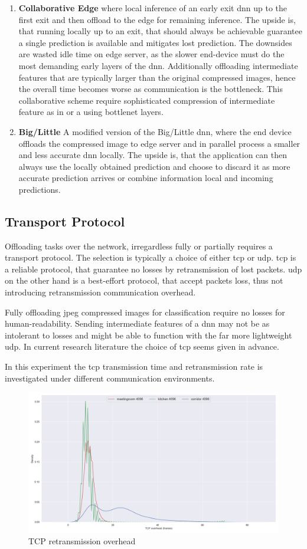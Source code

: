 \begin{enumerate}
	\item \textbf{Collaborative Edge} where local inference of an early exit \gls{dnn} up to the first exit and then offload to the edge for remaining inference. The upside is, that running locally up to an exit, that should always be achievable guarantee a single prediction is available and mitigates lost prediction. The downsides are wasted idle time on edge server, as the slower end-device must do the most demanding early layers of the \gls{dnn}. Additionally offloading intermediate features that are typically larger than the original compressed images, hence the overall time becomes worse as communication is the bottleneck. This collaborative scheme require sophisticated compression of intermediate feature as in \cite{choi_near-lossless_2018} or a using \gls{bottlenet} layers.
	\item \textbf{Big/Little} A modified version of the Big/Little \gls{dnn}, where the end device offloads the compressed image to edge server and in parallel process a smaller and less accurate \gls{dnn} locally. The upside is, that the application can then always use the locally obtained prediction and choose to discard it as more accurate prediction arrives or combine information local and incoming predictions.
\end{enumerate}

\subsection{Transport Protocol} 

Offloading tasks over the network, irregardless fully or partially requires a transport protocol. The selection is typically a choice of either \gls{tcp} or \gls{udp}. \gls{tcp} is a reliable protocol, that guarantee no losses by retransmission of lost packets. \gls{udp} on the other hand is a best-effort protocol, that accept packets loss, thus not introducing retransmission communication overhead. 


Fully offloading \gls{jpeg} compressed images for classification require no losses for human-readability. Sending intermediate features of a \gls{dnn} may not be as intolerant to losses and might be able to function with the far more lightweight \gls{udp}. In current research literature the choice of \gls{tcp} seems given in advance.  

In this experiment the \gls{tcp} transmission time and retransmission rate is investigated under different communication environments. 

\begin{figure}
	\centering
	\includegraphics[width=\linewidth]{figures/tcp/tcpoverhead}
	\caption[TCP retransmission overhead]{TCP retransmission overhead}
\end{figure}